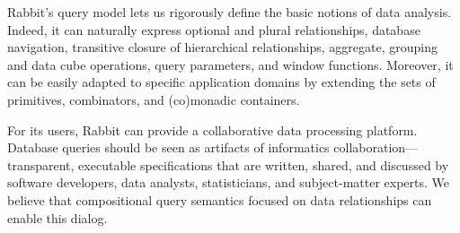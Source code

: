 Rabbit's query model lets us rigorously define the basic notions of data
analysis.  Indeed, it can naturally express optional and plural relationships,
database navigation, transitive closure of hierarchical relationships,
aggregate, grouping and data cube operations, query parameters, and window
functions.  Moreover, it can be easily adapted to specific application domains
by extending the sets of primitives, combinators, and (co)monadic containers.

For its users, Rabbit can provide a collaborative data processing platform.
Database queries should be seen as artifacts of informatics
collaboration---transparent, executable specifications that are written,
shared, and discussed by software developers, data analysts, statisticians, and
subject-matter experts.  We believe that compositional query semantics focused
on data relationships can enable this dialog.

